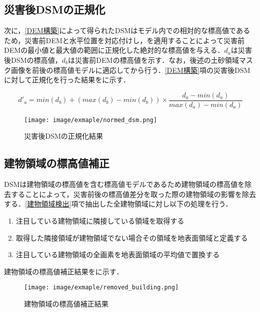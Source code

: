     \subsection{災害後DSMの正規化}
      \label{災害後DSMの正規化}
      次に，\ref{DEM構築}によって得られたDSMはモデル内での相対的な標高値であるため，災害前DEMと水平位置を対応付けし，を適用することによって災害前DEMの最小値と最大値の範囲に正規化した絶対的な標高値を与える．$d_{a}$は災害後DSMの標高値，$d_{b}$は災害前DEMの標高値を示す．なお，後述の土砂領域マスク画像を前後の標高値モデルに適応してから行う．\ref{DEM構築}項の災害後DSMに対して正規化を行った結果をに示す．

      \begin{equation}
        \label{正規化}
        d'_{a} =  
          min(d_{b}) + (max(d_{b}) - min(d_{b})) \times
          \dfrac{d_{a} - min(d_{a})} {max(d_{a}) - min(d_{a})}
      \end{equation}

      \begin{figure}[t]
        \centering
        \texttt{[image: image/exmaple/normed\_dsm.png]}
        \caption{災害後DSMの正規化結果}
        \label{正規化結果}
      \end{figure}


    \subsection{建物領域の標高値補正}
      DSMは建物領域の標高値を含む標高値モデルであるため建物領域の標高値を除去することによって，災害前後の標高値差分を取った際の建物領域の影響を除去する．\ref{建物領域検出}項で抽出した全建物領域に対し以下の処理を行う．

      \begin{enumerate}
        \setlength{\itemsep}{-5pt}
        \item 注目している建物領域に隣接している領域を取得する
        \item 取得した隣接領域が建物領域でない場合その領域を地表面領域と定義する
        \item 注目している建物領域の全画素を地表面領域の平均値で置換する
      \end{enumerate}

      建物領域の標高値補正結果をに示す．

      \begin{figure}[t]
        \centering
        \texttt{[image: image/exmaple/removed\_building.png]}
        \caption{建物領域の標高値補正結果}
        \label{建物領域の標高値補正結果}
      \end{figure}



